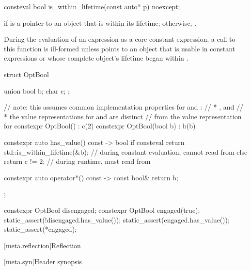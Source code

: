 %
\begin{itemdecl}
consteval bool is_within_lifetime(const auto* p) noexcept;
\end{itemdecl}

\begin{itemdescr}
\pnum
\returns
{} if  is a pointer to an object that is
within its lifetime; otherwise, .

\pnum
\remarks
During the evaluation of an expression  as a core constant expression,
a call to this function is ill-formed
unless  points to an object that is usable
in constant expressions or
whose complete object's lifetime began within .

\pnum
\begin{example}
\begin{codeblock}
struct OptBool {
  union { bool b; char c; };

  // note: this assumes common implementation properties for  and :
  // * , and
  // * the value representations for  and  are distinct
  //   from the value representation for 
  constexpr OptBool() : c(2) { }
  constexpr OptBool(bool b) : b(b) { }

  constexpr auto has_value() const -> bool {
    if consteval {
      return std::is_within_lifetime(&b);       // during constant evaluation, cannot read from 
    } else {
      return c != 2;                            // during runtime, must read from 
    }
  }

  constexpr auto operator*() const -> const bool& {
    return b;
  }
};

constexpr OptBool disengaged;
constexpr OptBool engaged(true);
static_assert(!disengaged.has_value());
static_assert(engaged.has_value());
static_assert(*engaged);
\end{codeblock}
\end{example}
\end{itemdescr}

[meta.reflection]{Reflection}

[meta.syn]{Header  synopsis}

